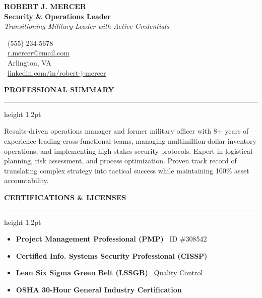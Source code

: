 \documentclass[10pt,letterpaper]{article}
\newcommand{\resumesection}[1]{%
  \vspace{7pt}%
  {\color{primarycolor}\bfseries\large\MakeUppercase{#1}}\par%
  \vspace{1.5pt}%
  {\color{accentcolor}\hrule height 1.2pt}\par%
  \vspace{4.5pt}%
}
\begin{document}
\begin{minipage}[c]{0.58\textwidth}
    {\Huge\bfseries\color{primarycolor} ROBERT J. MERCER} \\
    \vspace{2pt}
    {\large\bfseries\color{accentcolor} Security \& Operations Leader} \\
    \vspace{1pt}
    \textit{Transitioning Military Leader with Active Credentials}
\end{minipage}%
\hfill
\begin{minipage}[c]{0.38\textwidth}
    \flushright\small\color{textcolor}
    \faPhone\ (555) 234-5678 \\
    \faEnvelope\ \href{mailto:r.mercer@email.com}{r.mercer@email.com} \\
    \faMapMarker\ Arlington, VA \\
    \faLinkedin\ \href{https://linkedin.com/in/robert-j-mercer}{linkedin.com/in/robert-j-mercer}
\end{minipage}
\vspace{8pt}

\resumesection{Professional Summary}
{\color{textcolor}Results-driven operations manager and former military officer with 8+ years of experience leading cross-functional teams, managing multimillion-dollar inventory operations, and implementing high-stakes security protocols. Expert in logistical planning, risk assessment, and process optimization. Proven track record of translating complex strategy into tactical success while maintaining 100\% asset accountability.}

\resumesection{Certifications \& Licenses}
\begin{tcolorbox}[
  colback=primarycolor!5,
  colframe=primarycolor!20,
  arc=3pt,
  boxrule=0.8pt,
  left=8pt,
  right=8pt,
  top=6pt,
  bottom=6pt
]
\begin{minipage}[t]{0.48\textwidth}
  \begin{itemize}[leftmargin=12pt,nosep]
    \item \textbf{Project Management Professional (PMP)} \textendash\ ID \#308542
    \item \textbf{Certified Info. Systems Security Professional (CISSP)}
  \end{itemize}
\end{minipage}%
\hfill
\begin{minipage}[t]{0.48\textwidth}
  \begin{itemize}[leftmargin=12pt,nosep]
    \item \textbf{Lean Six Sigma Green Belt (LSSGB)} \textendash\ Quality Control
    \item \textbf{OSHA 30-Hour General Industry Certification}
  \end{itemize}
\end{minipage}
\end{tcolorbox}
\end{document}
